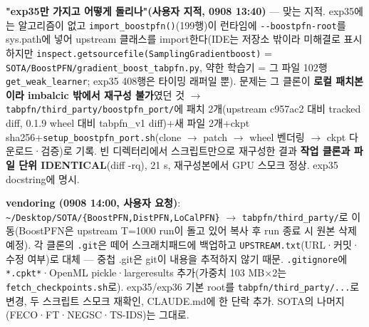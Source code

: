 \par\noindent \textbullet\enspace \textbf{"exp35만 가지고 어떻게 돌리나"(사용자 지적, 0908 13:40)} — 맞는 지적. exp35에는 알고리즘이 없고 \texttt{import\_\allowbreak{}\allowbreak{}b\allowbreak{}oostpfn(\allowbreak{})}(199행)이 런타임에 \texttt{-\allowbreak{}-\allowbreak{}boostp\allowbreak{}fn-\allowbreak{}root}를 sys.path에 넣어 upstream 클래스를 import한다(IDE는 저장소 밖이라 미해결로 표시하지만 \texttt{inspect.\allowbreak{}getsourc\allowbreak{}efile(Sa\allowbreak{}mplingGr\allowbreak{}adientbo\allowbreak{}ost)} =\allowbreak{} \texttt{SOTA/\allowbreak{}\allowbreak{}Boo\allowbreak{}stPFN/\allowbreak{}\allowbreak{}gr\allowbreak{}adient\_\allowbreak{}\allowbreak{}b\allowbreak{}oost\_\allowbreak{}\allowbreak{}tab\allowbreak{}pfn.\allowbreak{}py}, 약한 학습기 =\allowbreak{} 그 파일 102행 \texttt{get\_\allowbreak{}\allowbreak{}weak\allowbreak{}\_\allowbreak{}\allowbreak{}learner\allowbreak{}}; exp35 408행은 타이밍 래퍼일 뿐). 문제는 그 클론이 \textbf{로컬 패치본이라 imbalcic 밖에서 재구성 불가}였던 것  \ensuremath{\rightarrow}  \texttt{tabpfn/\allowbreak{}\allowbreak{}t\allowbreak{}hird\_\allowbreak{}\allowbreak{}par\allowbreak{}ty/\allowbreak{}\allowbreak{}boost\allowbreak{}pfn\_\allowbreak{}\allowbreak{}port\allowbreak{}/\allowbreak{}\allowbreak{}}에 패치 2개(upstream c957ac2 대비 tracked diff, 0.1.9 wheel 대비 tabpfn\_\allowbreak{}v1 diff)+\allowbreak{}새 파일 2개+\allowbreak{}ckpt sha256+\allowbreak{}\texttt{setup\_\allowbreak{}\allowbreak{}bo\allowbreak{}ostpfn\_\allowbreak{}\allowbreak{}p\allowbreak{}ort.\allowbreak{}sh}(clone \ensuremath{\rightarrow} patch \ensuremath{\rightarrow} wheel 벤더링 \ensuremath{\rightarrow} ckpt 다운로드·검증)로 기록. 빈 디렉터리에서 스크립트만으로 재구성한 결과 \textbf{작업 클론과 파일 단위 IDENTICAL}(diff -rq), 21 s, 재구성본에서 GPU 스모크 정상. exp35 docstring에 명시.


\par\noindent \textbullet\enspace \textbf{vendoring (0908 14:00, 사용자 요청)}: \texttt{\textasciitilde{}/\allowbreak{}\allowbreak{}Deskto\allowbreak{}p/\allowbreak{}\allowbreak{}SOTA/\allowbreak{}\allowbreak{}\{\allowbreak{}BoostPFN\allowbreak{},\allowbreak{}DistPFN\allowbreak{},\allowbreak{}LoCalPF\allowbreak{}N\}\allowbreak{}}  \ensuremath{\rightarrow}  \texttt{tabpfn/\allowbreak{}\allowbreak{}t\allowbreak{}hird\_\allowbreak{}\allowbreak{}par\allowbreak{}ty/\allowbreak{}\allowbreak{}}로 이동(BoostPFN은 upstream T=\allowbreak{}1000 run이 돌고 있어 복사 후 run 종료 시 원본 삭제 예정). 각 클론의 \texttt{.\allowbreak{}git}은 떼어 스크래치패드에 백업하고 \texttt{UPSTREAM\allowbreak{}.\allowbreak{}txt}(URL·커밋·수정 여부)로 대체 — 중첩 .git은 git이 내용을 추적하지 않기 때문. \texttt{.\allowbreak{}gitigno\allowbreak{}re}에 \texttt{*.\allowbreak{}cpkt*}·OpenML pickle·largeresults 추가(가중치 103 MB×2는 \texttt{fetch\_\allowbreak{}\allowbreak{}ch\allowbreak{}eckpoint\allowbreak{}s.\allowbreak{}sh}로). exp35/\allowbreak{}exp36 기본 root를 \texttt{tabpfn/\allowbreak{}\allowbreak{}t\allowbreak{}hird\_\allowbreak{}\allowbreak{}par\allowbreak{}ty/\allowbreak{}\allowbreak{}.\allowbreak{}.\allowbreak{}.\allowbreak{}}로 변경, 두 스크립트 스모크 재확인, CLAUDE.md에 한 단락 추가. SOTA의 나머지(FECO·FT·NEGSC·TS-IDS)는 그대로.


